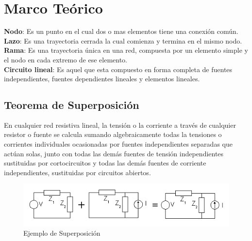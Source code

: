 \documentclass[twocolumn]{IEEEtran}
\begin{document}
\section{Marco Teórico}
\noindent
\textbf{Nodo}: Es un punto en el cual dos o mas elementos tiene una conexión común.\\
\textbf{Lazo}: Es una trayectoria cerrada la cual comienza y termina en el mismo nodo.\\
\textbf{Rama}: Es una trayectoria única en una red, compuesta por un elemento simple y el nodo en cada extremo de ese elemento.\\
\textbf{Circuito lineal}: Es aquel que esta compuesto en forma completa de fuentes independientes, fuentes dependientes lineales y elementos lineales.\\

\subsection{Teorema de Superposición}
\noindent
En cualquier red resistiva lineal, la tensión o la corriente a través de cualquier resistor o fuente se calcula sumando algebraicamente todas la tensiones o corrientes individuales ocasionadas por fuentes independientes separadas que actúan solas, junto con todas las demás fuentes de tensión independientes sustituidas por cortocircuitos y todas las demás fuentes de corriente independientes, sustituidas por circuitos abiertos.
\begin{figure}[H]
	\centering
		\includegraphics[scale=0.5]{ejemplo.png}
	\caption{Ejemplo de Superposición}
	\label{fig20}
\end{figure}
\end{document}
